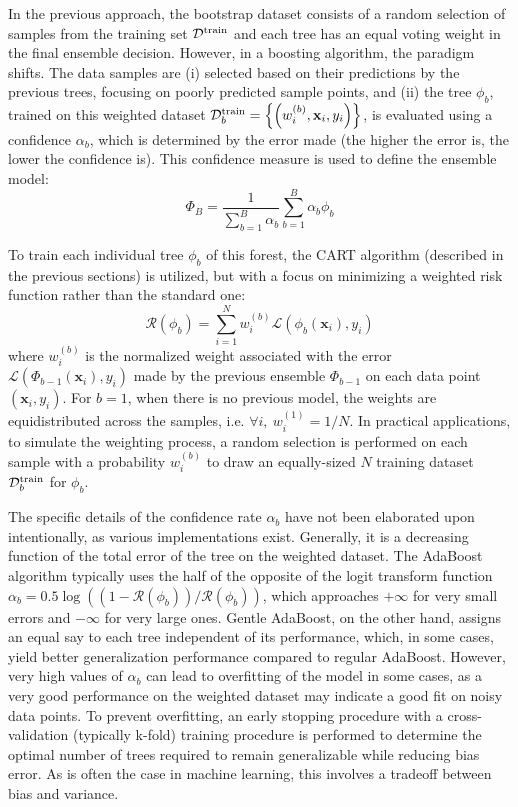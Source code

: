 \documentclass[main]{subfiles}
\begin{document}
In the previous approach, the bootstrap dataset consists of a random selection of samples from the training set $\mathcal{D}^{\text{train}}$ and each tree has an equal voting weight in the final ensemble decision. However, in a boosting algorithm,\autocite{drucker1997improving} the paradigm shifts. The data samples are (i) selected based on their predictions by the previous trees, focusing on poorly predicted sample points, and (ii) the tree $\phi_b$, trained on this weighted dataset $\mathcal{D}^{\text{train}}_b=\left\{\left(w_i^{(b)},\mathbf{x}_i,y_i\right)\right\}$, is evaluated using a confidence $\alpha_b$, which is determined by the error made (the higher the error is, the lower the confidence is). This confidence measure is used to define the ensemble model:
\begin{equation}
  \Phi_B = \frac{1}{\sum_{b=1}^{B} \alpha_b}\sum_{b=1}^{B} \alpha_b\phi_b
\end{equation}

To train each individual tree $\phi_b$ of this forest, the CART algorithm (described in the previous sections) is utilized, but with a focus on minimizing a weighted risk function rather than the standard one:
\begin{equation}
  \mathcal{R}(\phi_b) = \sum_{i=1}^N w_i^{(b)} \mathcal{L}\left(\phi_b(\mathbf{x}_i),y_i\right)
\end{equation}
where $w_i^{(b)}$ is the normalized weight associated with the error $\mathcal{L}\left(\Phi_{b-1}(\mathbf{x}_i),y_i\right)$ made by the previous ensemble $\Phi_{b-1}$ on each data point $\left(\mathbf{x}_i,y_i\right)$. For $b=1$, when there is no previous model, the weights are equidistributed across the samples, i.e. $\forall i,\ w_i^{(1)}=1/N$. In practical applications, to simulate the weighting process, a random selection is performed on each sample with a probability $w_i^{(b)}$ to draw an equally-sized $N$ training dataset $\mathcal{D}^{\text{train}}_b$ for $\phi_b$. 

The specific details of the confidence rate $\alpha_b$ have not been elaborated upon intentionally, as various implementations exist. Generally, it is a decreasing function of the total error of the tree on the weighted dataset. The AdaBoost algorithm typically uses the half of the opposite of the logit transform function $\alpha_b=0.5\log\left((1-\mathcal{R}(\phi_b))/\mathcal{R}(\phi_b)\right)$, which approaches $+\infty$ for very small errors and $-\infty$ for very large ones.\autocite{Freund_1997,schapire2013explaining} Gentle AdaBoost, on the other hand, assigns an equal say to each tree independent of its performance, which, in some cases, yield better generalization performance compared to regular AdaBoost. However, very high values of $\alpha_b$ can lead to overfitting of the model in some cases, as a very good performance on the weighted dataset may indicate a good fit on noisy data points.\autocite{schapire1998improved} To prevent overfitting, an early stopping procedure with a cross-validation (typically k-fold) training procedure is performed to determine the optimal number of trees required to remain generalizable while reducing bias error. As is often the case in machine learning, this involves a tradeoff between bias and variance.
\end{document}
